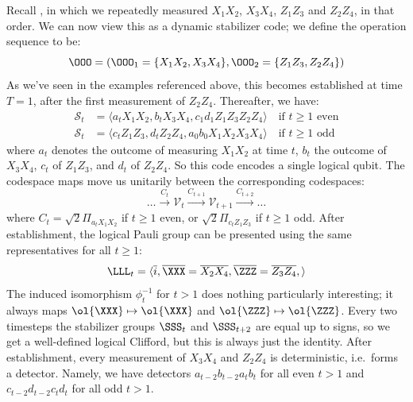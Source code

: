 \begin{example}
    Recall , in which we repeatedly measured $X_1 X_2$, $X_3 X_4$, $Z_1 Z_3$ and $Z_2 Z_4$, in that order.
    We can now view this as a dynamic stabilizer code; we define the operation sequence to be:
    \begin{equation}
        \OOO = (\OOO_1 = \{X_1 X_2, X_3 X_4\}, \OOO_2 = \{Z_1 Z_3, Z_2 Z_4\})
    \end{equation}
    As we've seen in the examples referenced above, this becomes established at time $T=1$, after the first measurement of $Z_2 Z_4$.
    Thereafter, we have:
    \begin{equation}
        \begin{aligned}
            \mathcal{S}_t &= \langle a_t X_1 X_2, b_t X_3 X_4, c_1 d_1 Z_1 Z_3 Z_2 Z_4 \rangle \quad \text{if $t \geq 1$ even} \\
            \mathcal{S}_t &= \langle c_t Z_1 Z_3, d_t Z_2 Z_4, a_0 b_0 X_1 X_2 X_3 X_4 \rangle \quad \text{if $t \geq 1$ odd}
        \end{aligned}
    \end{equation}
    where $a_t$ denotes the outcome of measuring $X_1 X_2$ at time $t$, $b_t$ the outcome of $X_3 X_4$, $c_t$ of $Z_1 Z_3$, and $d_t$ of $Z_2 Z_4$.
    So this code encodes a single logical qubit.
    The codespace maps move us unitarily between the corresponding codespaces:
    \begin{equation}
        \ldots \xrightarrow{C_t} \mathcal{V}_{t} \xrightarrow{C_{t+1}} \mathcal{V}_{t+1} \xrightarrow{C_{t+2}} \ldots
    \end{equation}
    where $C_t = \sqrt{2}\Pi_{a_t X_1 X_2}$ if $t \geq 1$ even, or $\sqrt{2}\Pi_{c_t Z_1 Z_3}$ if $t \geq 1$ odd.
    After establishment, the logical Pauli group can be presented using the same representatives for all $t \geq 1$:
    \begin{equation}
        \LLL_t = \langle
        \overline{i},
        \overline{\XXX} = \overline{X_2 X_4}, \overline{\ZZZ} = \overline{Z_3 Z_4},
        \rangle
    \end{equation}
    The induced isomorphism $\phi_t^{-1}$ for $t > 1$ does nothing particularly interesting; it always maps $\ol{\XXX} \mapsto \ol{\XXX}$ and $\ol{\ZZZ} \mapsto \ol{\ZZZ}$.
    Every two timesteps the stabilizer groups $\SSS_t$ and $\SSS_{t+2}$ are equal up to signs, so we get a well-defined logical Clifford, but this is always just the identity.
    After establishment, every measurement of $X_3 X_4$ and $Z_2 Z_4$ is deterministic, i.e.\ forms a detector.
    Namely, we have detectors $a_{t-2} b_{t-2} a_{t} b_{t}$ for all even $t > 1$ and $c_{t-2} d_{t-2} c_{t} d_{t}$ for all odd $t > 1$.
\end{example}
